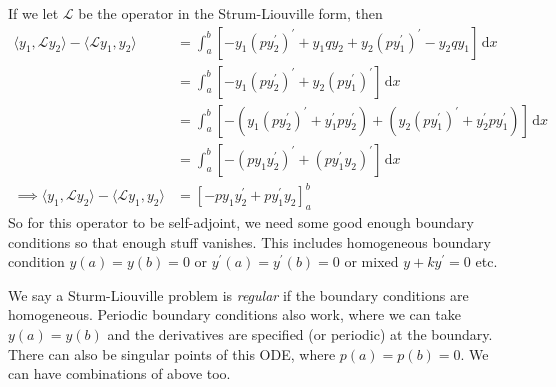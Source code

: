 \documentclass[a4paper]{article}
\begin{document}
If we let $\mathcal L$ be the operator in the Strum-Liouville form, then
\begin{align}
    \langle y_1,\mathcal Ly_2\rangle-\langle\mathcal Ly_1,y_2\rangle&=\int_a^b[-y_1(py_2^\prime)^\prime+y_1qy_2+y_2(py_1^\prime)^\prime-y_2qy_1]\,\mathrm dx\nonumber\\
    &=\int_a^b[-y_1(py_2^\prime)^\prime+y_2(py_1^\prime)^\prime]\,\mathrm dx\nonumber\\
    &=\int_a^b[-(y_1(py_2^\prime)^\prime+y_1^\prime py_2^\prime)+(y_2(py_1^\prime)^\prime+y_2^\prime py_1^\prime)]\,\mathrm dx\nonumber\\
    &=\int_a^b[-(py_1y_2^\prime)^\prime+(py_1^\prime y_2)^\prime]\,\mathrm dx\nonumber\\
    \implies \langle y_1,\mathcal Ly_2\rangle-\langle\mathcal Ly_1,y_2\rangle&=[-py_1y_2^\prime+py_1^\prime y_2]_a^b
\end{align}
So for this operator to be self-adjoint, we need some good enough boundary conditions so that enough stuff vanishes.
This includes homogeneous boundary condition $y(a)=y(b)=0$ or $y^\prime(a)=y^\prime(b)=0$ or mixed $y+ky^\prime=0$ etc.

We say a Sturm-Liouville problem is \textit{regular} if the boundary conditions are homogeneous.
Periodic boundary conditions also work, where we can take $y(a)=y(b)$ and the derivatives are specified (or periodic) at the boundary.
There can also be singular points of this ODE, where $p(a)=p(b)=0$.
We can have combinations of above too.
\end{document}
